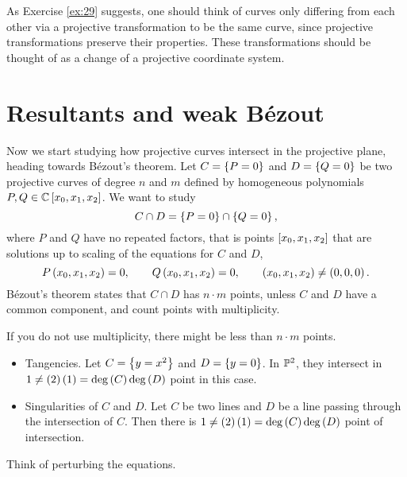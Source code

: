 \begin{remark}
As Exercise \ref{ex:29} suggests, one should think of curves only differing from each other via a projective transformation to be the same curve, since projective transformations preserve their properties. These transformations should be thought of as a change of a projective coordinate system.
\end{remark}

\pagebreak

\section{Resultants and weak B\'ezout}


Now we start studying how projective curves intersect in the projective plane, heading towards B\'ezout's theorem. Let $ C = \cbr{P = 0} $ and $ D = \cbr{Q = 0} $ be two projective curves of degree $ n $ and $ m $ defined by homogeneous polynomials $ P, Q \in \C\sbr{x_0, x_1, x_2} $. We want to study
$$ C \cap D = \cbr{P = 0} \cap \cbr{Q = 0}, $$
where $ P $ and $ Q $ have no repeated factors, that is points $ \sbr{x_0, x_1, x_2} $ that are solutions up to scaling of the equations for $ C $ and $ D $,
$$ P\br{x_0, x_1, x_2} = 0, \qquad Q\br{x_0, x_1, x_2} = 0, \qquad \br{x_0, x_1, x_2} \ne \br{0, 0, 0}. $$
B\'ezout's theorem states that $ C \cap D $ has $ n \cdot m $ points, unless $ C $ and $ D $ have a common component, and count points with multiplicity.

\begin{example*}
If you do not use multiplicity, there might be less than $ n \cdot m $ points.
\begin{itemize}
\item Tangencies. Let $ C = \cbr{y = x^2} $ and $ D = \cbr{y = 0} $. In $ \P^2 $, they intersect in $ 1 \ne \br{2}\br{1} = \deg\br{C}\deg\br{D} $ point in this case.
\item Singularities of $ C $ and $ D $. Let $ C $ be two lines and $ D $ be a line passing through the intersection of $ C $. Then there is $ 1 \ne \br{2}\br{1} = \deg\br{C}\deg\br{D} $ point of intersection.
\end{itemize}
Think of perturbing the equations.
\end{example*}

